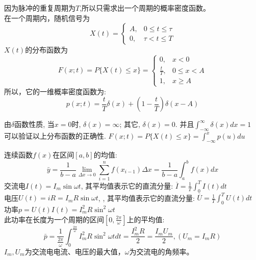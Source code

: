 \begin{frame}[shrink]
\begin{example}[解]
	因为脉冲的重复周期为$T$,所以只需求出一个周期的概率密度函数。\\
	在一个周期内，随机信号为
	\[
	X(t)=\begin{cases}
	A,&0\le t\le\tau\\
	0,&\tau<t\le T
	\end{cases} 
	\]
	$X(t)$的分布函数为
	\[
	F(x;t)=P\{X(t)\le x \}=\begin{cases}
	0,&x<0\\
	\frac{t}{T},&0\le x<A\\
	1,&x\ge A
	\end{cases} 
	\]
	所以，它的一维概率密度函数为:
	\[p(x;t)=\frac{t}{T}\delta(x)+(1-\frac{t}{T})\delta(x-A) \]
\end{example}
\small
由$\delta$函数性质, 当$x=0$时, $\delta(x)=\infty$; 其它, $\delta(x)=0$. 并且$\int_{-\infty}^{\infty}\delta(x)dx=1$\\
可以验证以上分布函数的正确性.  $F(x; t)=P\{X(t)\le x\}=\int_{-\infty}^{x}p(u)du$
\end{frame}


\begin{frame}
连续函数$f(x)$在区间$[a,b]$的均值:
\[\bar{y}=\frac{1}{b-a}\lim\limits_{\Delta x\to 0}\sum\limits_{i=1}^{n}f(x_{i-1})\Delta x=\frac{1}{b-a}\int_{a}^{b}f(x)dx \]
交流电$I(t)=I_m\sin\omega t$, 其平均值表示它的直流分量: $\overline{I}=\frac{1}{T}\int_{0}^{T}I(t)dt$\\
电压$U(t)=iR=I_mR\sin\omega t$, , 其平均值表示它的直流分量: $\overline{U}=\frac{1}{T}\int_{0}^{T}U(t)dt$\\
功率$p=U(t)I(t)=I_m^2R\sin^2\omega t$\\
此功率在长度为一个周期的区间$[0,\frac{2\pi}{\omega}]$上的平均值:
\[\bar{p}=\frac{1}{\frac{2\pi}{\omega}}\int_{0}^{\frac{2\pi}{\omega}}I_m^2R\sin^2\omega tdt=\frac{I_m^2R}{2}=\frac{I_mU_m}{2},(U_m=I_mR) \]
$I_m,U_m$为交流电电流、电压的最大值，$\omega$为交流电的角频率。
\end{frame}

